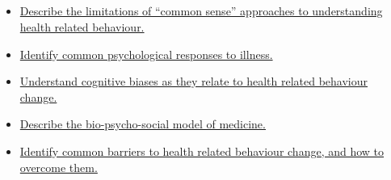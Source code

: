 \documentclass[10pt, a4paper]{article}
\begin{document}
\subsection{} \begin{itemize} \item \href{https://www.notion.so/2013a66f51a545249a2e1872212d3aad}{Describe the limitations of “common sense” approaches to understanding health related behaviour.} \item \href{https://www.notion.so/5a00a657772d4412aba34fc8eb12b4f3}{Identify common psychological responses to illness.} \item \href{https://www.notion.so/11a5c030244a458ab3ac2c5f65795f8b}{Understand cognitive biases as they relate to health related behaviour change.} \item \href{https://www.notion.so/e109ca172dc1486e9221acfd7e5b5a91}{Describe the bio-psycho-social model of medicine.} \item \href{https://www.notion.so/f4f3eb1d25fe46a2b6ef648257384718}{Identify common barriers to health related behaviour change, and how to overcome them.} \end{itemize}
\end{document}
